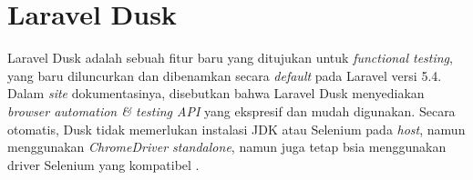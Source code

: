    \section{Laravel Dusk}
   Laravel Dusk adalah sebuah fitur baru yang ditujukan untuk \textit{functional testing}, yang baru diluncurkan dan dibenamkan secara \textit{default} pada Laravel versi 5.4. Dalam \textit{site} dokumentasinya, disebutkan bahwa Laravel Dusk menyediakan \textit{browser automation \& testing API} yang ekspresif dan mudah digunakan. Secara otomatis, Dusk tidak memerlukan instalasi JDK atau Selenium pada \textit{host}, namun menggunakan \textit{ChromeDriver standalone}, namun juga tetap bsia menggunakan driver Selenium yang kompatibel \cite{laravel_browser_nodate}.

